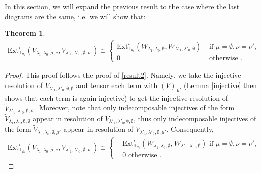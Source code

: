 \documentclass[openany, a4paper]{amsbook}
\newtheorem{thm}{Theorem}[chapter]
\theoremstyle{definition}
\numberwithin{equation}{chapter}
\newcommand{\T}[1]{{\mathbb{T}}_{\aleph_{#1}}}
\newcommand{\Ext}[4]{\mathrm{Ext}^{#1}_{#2}({#3}, {#4})}
\begin{document}
In this section, we will expand the previous result to the case where the last diagrams are the same, i.e. we will show that:

\begin{thm}\label{result 4}
    \begin{align}
        \Ext{i}{\T{1}}{V_{\lambda_1, \lambda_0, \mu, \nu}}{V_{\lambda'_1, \lambda'_0, \emptyset, \nu'}} \cong
        \begin{cases}
             \Ext{i}{\T{0}}{W_{\lambda_1, \lambda_0, \emptyset}}{W_{\lambda'_1, \lambda'_0, \emptyset}} &\text{ if } \mu = \emptyset, \nu = \nu', \\
             0 & \text{ otherwise }.
        \end{cases}
    \end{align}
\end{thm}

\begin{proof}
    This proof follows the proof of \ref{result2}. Namely, we take the injective resolution of $V_{\lambda'_1, \lambda'_0, \emptyset, \emptyset}$ and tensor each term with $(V)_{\mu'}$ (Lemma \ref{injective} then shows that each term is again injective) to get the injective resolution of $\tilde{V}_{\lambda'_1, \lambda'_0, \emptyset, \nu'}$. Moreover, note that only indecomposable injectives of the form $\tilde{V}_{\lambda_1, \lambda_0, \emptyset, \emptyset}$ appear in resolution of $V_{\lambda'_1, \lambda'_0, \emptyset, \emptyset}$, thus only indecomposable injectives of the form $\tilde{V}_{\lambda_1, \lambda_0, \emptyset, \mu'}$ appear in resolution of $V_{\lambda'_1, \lambda'_0, \emptyset, \mu'}$. Consequently,
    \begin{align*}
        \Ext{i}{\T{1}}{V_{\lambda_1, \lambda_0, \mu, \nu}}{V_{\lambda'_1, \lambda'_0, \emptyset, \nu'}} \cong
        \begin{cases}
            & \Ext{i}{\T{0}}{W_{\lambda_1, \lambda_0, \emptyset}}{W_{\lambda'_1, \lambda'_0, \emptyset}} \text{ if } \mu = \emptyset, \nu = \nu', \\
            & 0 \text{ otherwise }.
        \end{cases}
    \end{align*}
\end{proof}
\end{document}
